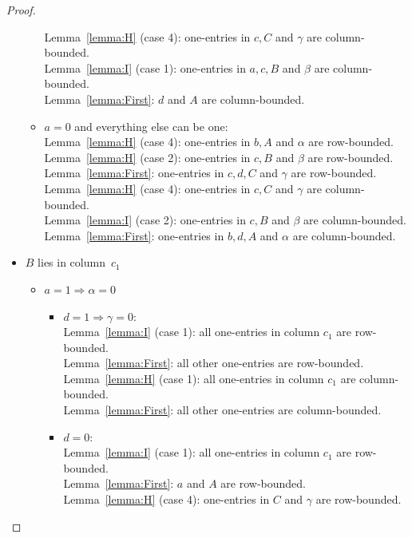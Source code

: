 \begin{proof}
\begin{itemize}
\begin{itemize}
			Lemma~\ref{lemma:H} (case 4): one-entries in $c,C$ and $\gamma$ are column-bounded.\\
			Lemma~\ref{lemma:I} (case 1): one-entries in $a,c,B$ and $\beta$ are column-bounded.\\
			Lemma~\ref{lemma:First}: $d$ and $A$ are column-bounded.
		\item $a=0$ and everything else can be one:\\
			Lemma~\ref{lemma:H} (case 4): one-entries in $b,A$ and $\alpha$ are row-bounded.\\
			Lemma~\ref{lemma:H} (case 2): one-entries in $c,B$ and $\beta$ are row-bounded.\\
			Lemma~\ref{lemma:First}: one-entries in $c,d,C$ and $\gamma$ are row-bounded.\\
			
			Lemma~\ref{lemma:H} (case 4): one-entries in $c,C$ and $\gamma$ are column-bounded.\\
			Lemma~\ref{lemma:I} (case 2): one-entries in $c,B$ and $\beta$ are column-bounded.\\
			Lemma~\ref{lemma:First}: one-entries in $b,d,A$ and $\alpha$ are column-bounded.			
	\end{itemize}
\item $B$ lies in column~$c_1$
	\begin{itemize}
		\item $a=1\Rightarrow\alpha=0$
			\begin{itemize}
				\item $d=1\Rightarrow\gamma=0$:\\
					Lemma~\ref{lemma:I} (case 1): all one-entries in column $c_1$ are row-bounded.\\
					Lemma~\ref{lemma:First}: all other one-entries are row-bounded.\\
					
					Lemma~\ref{lemma:H} (case 1): all one-entries in column $c_1$ are column-bounded.\\
					Lemma~\ref{lemma:First}: all other one-entries are column-bounded.
				\item $d=0$:\\
					Lemma~\ref{lemma:I} (case 1): all one-entries in column $c_1$ are row-bounded.\\
					Lemma~\ref{lemma:First}: $a$ and $A$ are row-bounded.\\
					Lemma~\ref{lemma:H} (case 4): one-entries in $C$ and $\gamma$ are row-bounded.\\
					

\end{itemize}
\end{itemize}
\end{itemize}
\end{proof}
